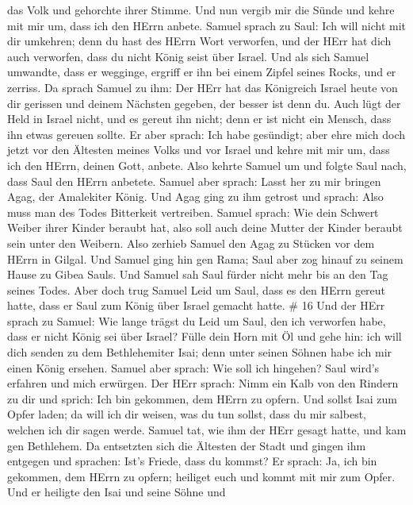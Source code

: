 das Volk und gehorchte ihrer Stimme.  Und nun vergib mir
die Sünde und kehre mit mir um, dass ich den HErrn anbete. 
Samuel sprach zu Saul: Ich will nicht mit dir umkehren; denn du hast des
HErrn Wort verworfen, und der HErr hat dich auch verworfen, dass du
nicht König seist über Israel.  Und als sich Samuel
umwandte, dass er wegginge, ergriff er ihn bei einem Zipfel seines
Rocks, und er zerriss.  Da sprach Samuel zu ihm: Der HErr
hat das Königreich Israel heute von dir gerissen und deinem Nächsten
gegeben, der besser ist denn du.  Auch lügt der Held in
Israel nicht, und es gereut ihn nicht; denn er ist nicht ein Mensch,
dass ihn etwas gereuen sollte.  Er aber sprach: Ich habe
gesündigt; aber ehre mich doch jetzt vor den Ältesten meines Volks und
vor Israel und kehre mit mir um, dass ich den HErrn, deinen Gott,
anbete.  Also kehrte Samuel um und folgte Saul nach, dass
Saul den HErrn anbetete.  Samuel aber sprach: Lasst her zu
mir bringen Agag, der Amalekiter König. Und Agag ging zu ihm getrost und
sprach: Also muss man des Todes Bitterkeit vertreiben. 
Samuel sprach: Wie dein Schwert Weiber ihrer Kinder beraubt hat, also
soll auch deine Mutter der Kinder beraubt sein unter den Weibern. Also
zerhieb Samuel den Agag zu Stücken vor dem HErrn in Gilgal.
 Und Samuel ging hin gen Rama; Saul aber zog hinauf zu
seinem Hause zu Gibea Sauls.  Und Samuel sah Saul fürder
nicht mehr bis an den Tag seines Todes. Aber doch trug Samuel Leid um
Saul, dass es den HErrn gereut hatte, dass er Saul zum König über Israel
gemacht hatte. \# 16  Und der HErr sprach zu Samuel: Wie
lange trägst du Leid um Saul, den ich verworfen habe, dass er nicht
König sei über Israel? Fülle dein Horn mit Öl und gehe hin: ich will
dich senden zu dem Bethlehemiter Isai; denn unter seinen Söhnen habe ich
mir einen König ersehen.  Samuel aber sprach: Wie soll ich
hingehen? Saul wird's erfahren und mich erwürgen. Der HErr sprach: Nimm
ein Kalb von den Rindern zu dir und sprich: Ich bin gekommen, dem HErrn
zu opfern.  Und sollst Isai zum Opfer laden; da will ich dir
weisen, was du tun sollst, dass du mir salbest, welchen ich dir sagen
werde.  Samuel tat, wie ihm der HErr gesagt hatte, und kam
gen Bethlehem. Da entsetzten sich die Ältesten der Stadt und gingen ihm
entgegen und sprachen: Ist's Friede, dass du kommst?  Er
sprach: Ja, ich bin gekommen, dem HErrn zu opfern; heiliget euch und
kommt mit mir zum Opfer. Und er heiligte den Isai und seine Söhne und
